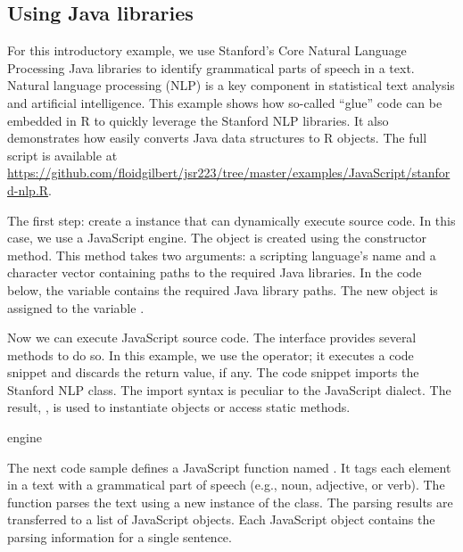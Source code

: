 \subsection{Using Java libraries}

For this introductory example, we use Stanford's Core Natural Language Processing Java libraries \citep{stanfordcorenlp} to identify grammatical parts of speech in a text. Natural language processing (NLP) is a key component in statistical text analysis and artificial intelligence. This example shows how so-called ``glue'' code can be embedded in R to quickly leverage the Stanford NLP libraries. It also demonstrates how easily  converts Java data structures to R objects. The full script is available at \url{https://github.com/floidgilbert/jsr223/tree/master/examples/JavaScript/stanford-nlp.R}.

The first step: create a   instance that can dynamically execute source code. In this case, we use a JavaScript engine. The object is created using the  constructor method. This method takes two arguments: a scripting language's name and a character vector containing paths to the required Java libraries. In the code below, the  variable contains the required Java library paths. The new  object is assigned to the variable .

Now we can execute JavaScript source code. The  interface provides several methods to do so. In this example, we use the  operator; it executes a code snippet and discards the return value, if any. The code snippet imports the Stanford NLP  class. The import syntax is peculiar to the JavaScript dialect. The result, , is used to instantiate objects or access static methods.

\begin{example}
engine %
\end{example}
The next code sample defines a JavaScript function named . It tags each element in a text with a grammatical part of speech (e.g., noun, adjective, or verb). The function parses the text using a new instance of the  class. The parsing results are transferred to a list of JavaScript objects. Each JavaScript object contains the parsing information for a single sentence.

